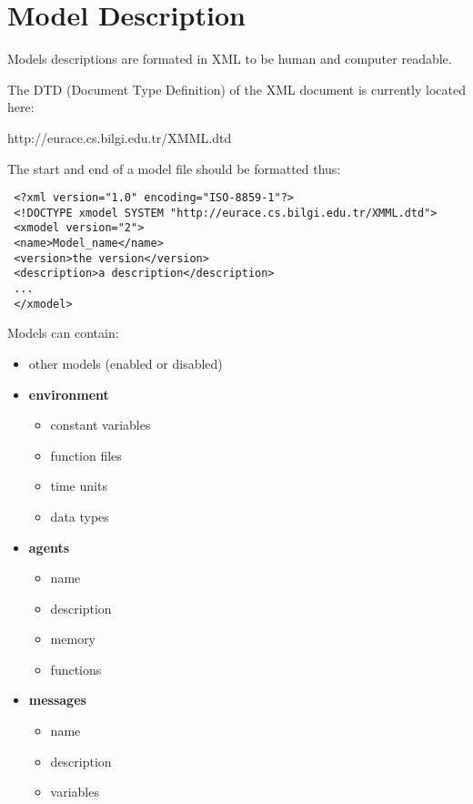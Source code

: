 \section{Model Description}

Models descriptions are formated in XML to be human and computer readable.

The DTD (Document Type Definition) of the XML document is currently located
here:

http://eurace.cs.bilgi.edu.tr/XMML.dtd

The start and end of a model file should be formatted thus:

\begin{mylisting}
\begin{verbatim}
 <?xml version="1.0" encoding="ISO-8859-1"?>
 <!DOCTYPE xmodel SYSTEM "http://eurace.cs.bilgi.edu.tr/XMML.dtd">
 <xmodel version="2">
 <name>Model_name</name>
 <version>the version</version>
 <description>a description</description>
 ...
 </xmodel>
\end{verbatim}
\end{mylisting}

Models can contain:
\begin{itemize}
\item other models (enabled or disabled)
\item \textbf{environment}
\begin{itemize}
\item constant variables
\item function files
\item time units
\item data types
\end{itemize}
\item \textbf{agents}
\begin{itemize}
\item name
\item description
\item memory
\item functions
\end{itemize}
\item \textbf{messages}
\begin{itemize}
\item name
\item description
\item variables
\end{itemize}
\end{itemize}

